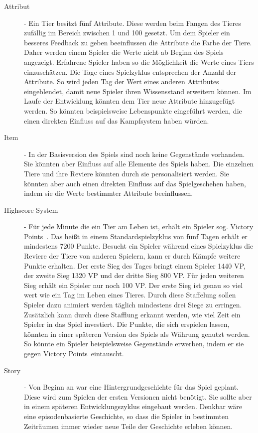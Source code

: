 \begin{description}
\item[Attribut] - 
Ein Tier besitzt fünf Attribute. Diese werden beim Fangen des Tieres zufällig im Bereich zwischen 1 und 100 gesetzt. Um dem Spieler ein besseres Feedback zu geben beeinflussen die Attribute die Farbe der Tiere. Daher werden einem Spieler die Werte nicht ab Beginn des Spiels angezeigt. Erfahrene Spieler haben so die Möglichkeit die Werte eines Tiers einzuschätzen. Die Tage eines Spielzyklus entsprechen der Anzahl der Attribute. So wird jeden Tag der Wert eines anderen Attributes eingeblendet, damit neue Spieler ihren Wissensstand erweitern können. Im Laufe der Entwicklung könnten dem Tier neue Attribute hinzugefügt werden. So könnten beispielsweise Lebenspunkte eingeführt werden, die einen direkten Einfluss auf das Kampfsystem haben würden.


\item[Item] - 
In der Basisversion des Spiels sind noch keine Gegenstände vorhanden. Sie könnten aber Einfluss auf alle Elemente des Spiels haben. Die einzelnen Tiere und ihre Reviere könnten durch sie personalisiert werden. Sie könnten aber auch einen direkten Einfluss auf das Spielgeschehen haben, indem sie die Werte bestimmter Attribute beeinflussen. 


\item[Highscore System] - 
Für jede Minute die ein Tier am Leben ist, erhält ein Spieler sog. \glqq Victory Points\grqq\ . Das heißt in einem Standardspielzyklus von fünf Tagen erhält er mindestens 7200 Punkte. Besucht ein Spieler während eines Spielzyklus die Reviere der Tiere von anderen Spielern, kann er durch Kämpfe weitere Punkte erhalten. Der erste Sieg des Tages bringt einem Spieler 1440 VP, der zweite Sieg 1320 VP und der dritte Sieg 800 VP. Für jeden weiteren Sieg erhält ein Spieler nur noch 100 VP. Der erste Sieg ist genau so viel wert wie ein Tag im Leben eines Tieres. Durch diese Staffelung sollen Spieler dazu animiert werden täglich mindestens drei Siege zu erringen. Zusätzlich kann durch diese Stafflung erkannt werden, wie viel Zeit ein Spieler in das Spiel investiert. Die Punkte, die sich erspielen lassen, könnten in einer späteren Version des Spiels als Währung genutzt werden. So könnte ein Spieler beispielsweise Gegenstände erwerben, indem er sie gegen \glqq Victory Points\grqq\ eintauscht. 

\item[Story] - 
Von Beginn an war eine Hintergrundgeschichte für das Spiel geplant. Diese wird zum Spielen der ersten Versionen nicht benötigt. Sie sollte aber in einem späteren Entwicklungszyklus eingebaut werden. Denkbar wäre eine episodenbasierte Geschichte, so dass die Spieler in bestimmten Zeiträumen immer wieder neue Teile der Geschichte erleben können. 


\end{description}
